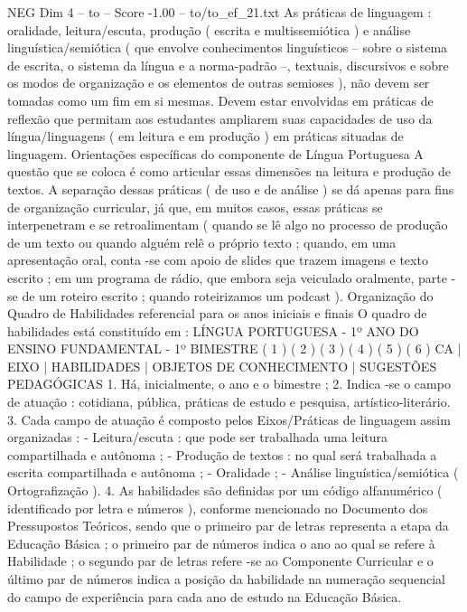 \begin{textsample}{NEG Dim 4 – to – Score -1.00 – to/to\_ef\_21.txt}  \label{ex:f4_neg_084}
As práticas de linguagem : oralidade, leitura/escuta, produção ( escrita e multissemiótica ) e análise linguística/semiótica ( que envolve conhecimentos linguísticos – sobre o sistema de escrita, o sistema da língua e a norma-padrão –, textuais, discursivos e sobre os modos de organização e os elementos de outras semioses ), não devem ser tomadas como um fim em si mesmas.
Devem estar envolvidas em práticas de reflexão que permitam aos estudantes ampliarem suas capacidades de uso da língua/linguagens ( em leitura e em produção ) em práticas situadas de linguagem.
Orientações específicas do componente de Língua Portuguesa A questão que se coloca é como articular essas dimensões na leitura e produção de textos.
A separação dessas práticas ( de uso e de análise ) se dá apenas para fins de organização curricular, já que, em muitos casos, essas práticas se interpenetram e se retroalimentam ( quando se lê algo no processo de produção de um texto ou quando alguém relê o próprio texto ; quando, em uma apresentação oral, conta -se com apoio de slides que trazem imagens e texto escrito ; em um programa de rádio, que embora seja veiculado oralmente, parte -se de um roteiro escrito ; quando roteirizamos um podcast ).
Organização do Quadro de Habilidades referencial para os anos iniciais e finais O quadro de habilidades está constituído em : LÍNGUA PORTUGUESA - 1º ANO DO ENSINO FUNDAMENTAL - 1º BIMESTRE ( 1 ) ( 2 ) ( 3 ) ( 4 ) ( 5 ) ( 6 ) CA | EIXO | HABILIDADES | OBJETOS DE CONHECIMENTO | SUGESTÕES PEDAGÓGICAS 1.
Há, inicialmente, o ano e o bimestre ; 2.
Indica -se o campo de atuação : cotidiana, pública, práticas de estudo e pesquisa, artístico-literário. 3.
Cada campo de atuação é composto pelos Eixos/Práticas de linguagem assim organizadas : - Leitura/escuta : que pode ser trabalhada uma leitura compartilhada e autônoma ; - Produção de textos : no qual será trabalhada a escrita compartilhada e autônoma ; - Oralidade ; - Análise linguística/semiótica ( Ortografização ). 4.
As habilidades são definidas por um código alfanumérico ( identificado por letra e números ), conforme mencionado no Documento dos Pressupostos Teóricos, sendo que o primeiro par de letras representa a etapa da Educação Básica ; o primeiro par de números indica o ano ao qual se refere à Habilidade ; o segundo par de letras refere -se ao Componente Curricular e o último par de números indica a posição da habilidade na numeração sequencial do campo de experiência para cada ano de estudo na Educação Básica.

\end{textsample}
